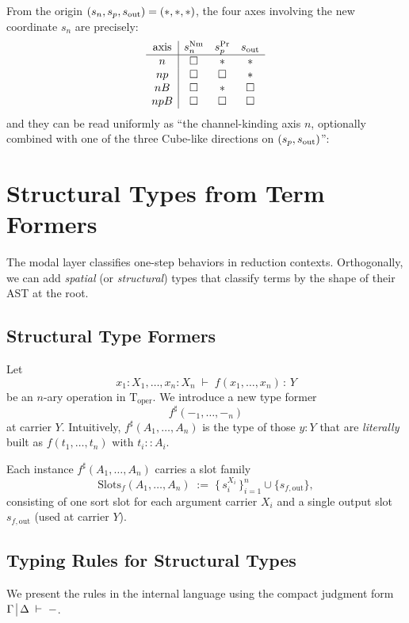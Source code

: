 \documentclass[11pt]{article}
\makeatletter
\theoremstyle{definition}
\theoremstyle{plain}
\theoremstyle{remark}
\theoremstyle{plain}
\newcommand{\judg}[3]{%
  \begingroup
    \setlength{\arraycolsep}{0.3ex}%
    \ensuremath{%
      \begin{array}[t]{@{}l@{\;}|@{\;}l@{}}%
        #1 & #2%
      \end{array}%
      \;\vdash\; #3%
    }%
  \endgroup
}
\newcommand{\Slots}{\mathrm{Slots}}
\newcommand{\Boxsort}{\Box}
\newcommand{\astsort}{\ast}
\renewcommand{\Pr}{{\rm Pr}}
\newcommand{\Nm}{{\rm Nm}}
\newcommand{\of}{\,{:}\,}
\newcommand{\mrm}[1]{\mathrm{#1}}
\newcommand{\T}{\mrm{T}}
\makeatother
\begin{document}
From the origin \((s_n,s_p,s_{\rm out})=(\astsort,\astsort,\astsort)\), the four axes involving the new
coordinate \(s_n\) are precisely:
\[
\begin{array}{c|ccc}
\text{axis} & s_n^{\Nm} & s_p^{\Pr} & s_{\rm out} \\
\hline
n   & \Boxsort & \astsort & \astsort \\
np  & \Boxsort & \Boxsort & \astsort \\
nB  & \Boxsort & \astsort & \Boxsort \\
npB & \Boxsort & \Boxsort & \Boxsort
\end{array}
\]
and they can be read uniformly as ``the channel-kinding axis \(n\), optionally combined with one of the
three Cube-like directions on \((s_p,s_{\rm out})\)'':

\section{Structural Types from Term Formers}
\label{sec:spatial}

The modal layer classifies one-step behaviors in reduction contexts.  Orthogonally, we can add \emph{spatial} (or \emph{structural}) types that classify terms by the shape of their AST at the root.

\subsection{Structural Type Formers}

Let
\[
  x_1:X_1,\dots,x_n:X_n \;\vdash\; f(x_1,\dots,x_n) \of Y
\]
be an $n$-ary operation in $\T_{\mrm{oper}}$.  We introduce a new type former
\[
  f^{\sharp}(-_1,\dots,-_n)
\]
at carrier $Y$.  Intuitively, $f^{\sharp}(A_1,\dots,A_n)$ is the type of those $y:Y$ that are \emph{literally} built as $f(t_1,\dots,t_n)$ with $t_i::A_i$.

Each instance $f^{\sharp}(A_1,\dots,A_n)$ carries a slot family
\[
  \Slots_f(A_1,\dots,A_n)
  \;:=\;
  \{\,s_i^{X_i}\,\}_{i=1}^n \cup \{s_{f,\mrm{out}}\},
\]
consisting of one sort slot for each argument carrier $X_i$ and a single output slot $s_{f,\mrm{out}}$ (used at carrier $Y$).

\subsection{Typing Rules for Structural Types}

We present the rules in the internal language using the compact judgment form $\judg{\Gamma}{\Delta}{-}$.
\end{document}
